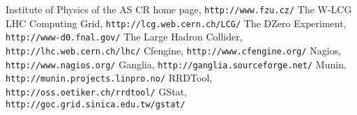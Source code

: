 \documentclass{article}
\begin{document}
\begin{thebibliography}{9}
    Institute of Physics of the AS CR home page, {\tt http://www.fzu.cz/}
    The W-LCG LHC Computing Grid, {\tt http://lcg.web.cern.ch/LCG/}
    The DZero Experiment, {\tt http://www-d0.fnal.gov/}
    The Large Hadron Collider, {\tt http://lhc.web.cern.ch/lhc/}
    Cfengine, {\tt http://www.cfengine.org/}
    Nagios, {\tt http://www.nagios.org/}
    Ganglia, {\tt http://ganglia.sourceforge.net/}
    Munin, {\tt http://munin.projects.linpro.no/}
    RRDTool, {\tt http://oss.oetiker.ch/rrdtool/}
    GStat, {\tt http://goc.grid.sinica.edu.tw/gstat/}
\end{thebibliography}
\end{document}
